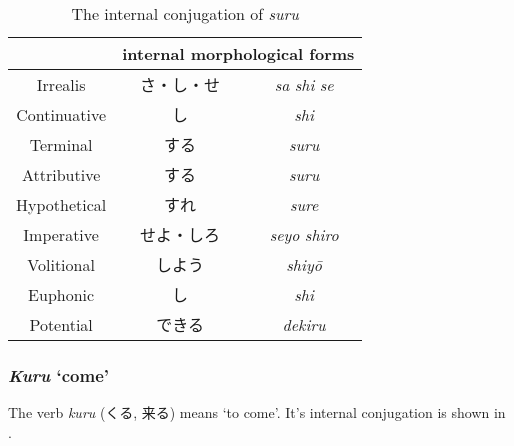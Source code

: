 \documentclass[UTF8, a4paper, oneside, scheme=plain]{ctexrep}
\newcommand{\corpus}[1]{\emph{#1}}
\newcommand{\translate}[1]{`#1'}
\begin{document}
\begin{table}[H]
    \caption{The internal conjugation of \corpus{suru}}
    \label{tbl:suru-table}
    \centering
    \begin{tabular}{ccc}
        \toprule
        \multicolumn{1}{l}{}           & \multicolumn{2}{l}{internal morphological forms} \\
        \midrule
        Irrealis                       & さ・し・せ                   & \corpus{sa} \corpus{shi} \corpus{se}              \\
        Continuative                   & し                        & \corpus{shi}                   \\
        Terminal                       & する                      & \corpus{suru}                   \\
        Attributive                    & する                      & \corpus{suru}                   \\
        Hypothetical                   & すれ                      & \corpus{sure}                   \\
        Imperative                     & せよ・しろ             & \corpus{seyo} \corpus{shiro}             \\ 
        Volitional                     & しよう                 & \corpus{shiy\={o}} \\
        Euphonic                       & し                        & \corpus{shi}                   \\
        Potential                      & できる                 & \corpus{dekiru} \\
        \bottomrule
    \end{tabular}
\end{table}

\subsubsection{\corpus{Kuru} \translate{come}}

The verb \corpus{kuru} (くる, 来る) means \translate{to come}.
It's internal conjugation is shown in .
\end{document}
